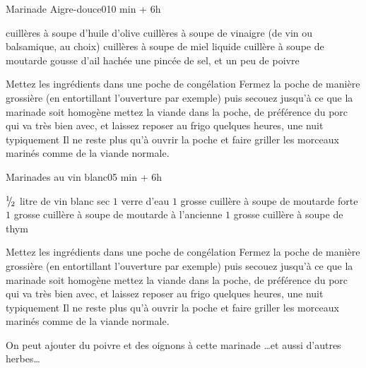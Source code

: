 

\begin{recette}{Marinade Aigre-douce}{0}{10 min + 6h}{}
\begin{ingredients}
 cuillères à soupe d'huile d'olive
 cuillères à soupe de vinaigre (de vin ou balsamique, au choix)
 cuillères à soupe de miel liquide
 cuillère à soupe de moutarde
 gousse d'ail hachée
\ingredient une pincée de sel, et un peu de poivre
\end{ingredients}

\begin{preparation}
\etape Mettez les ingrédients dans une poche de congélation
\etape Fermez la poche de manière grossière (en entortillant l'ouverture par exemple) puis secouez jusqu'à ce que la marinade soit homogène
\etape mettez la viande dans la poche, de préférence du porc qui va très bien avec, et laissez reposer au frigo quelques heures, une nuit typiquement
\etape Il ne reste plus qu'à ouvrir la poche et faire griller les morceaux marinés comme de la viande normale.
\end{preparation}

\end{recette}

\begin{recette}{Marinades au vin blanc}{0}{5 min + 6h}{}
\begin{ingredients}
\ingredient ${{}^{1\!\!}/ _{\!2}}$ litre de vin blanc sec
\ingredient $1$ verre d'eau
\ingredient $1$ grosse cuillère à soupe de moutarde forte
\ingredient $1$ grosse cuillère à soupe de moutarde à l'ancienne
\ingredient $1$ grosse cuillère à soupe de thym
\end{ingredients}

\begin{preparation}
\etape Mettez les ingrédients dans une poche de congélation
\etape Fermez la poche de manière grossière (en entortillant l'ouverture par exemple) puis secouez jusqu'à ce que la marinade soit homogène
\etape mettez la viande dans la poche, de préférence du porc qui va très bien avec, et laissez reposer au frigo quelques heures, une nuit typiquement
\etape Il ne reste plus qu'à ouvrir la poche et faire griller les morceaux marinés comme de la viande normale.
\end{preparation}

\begin{remarque}
On peut ajouter du poivre et des oignons à cette marinade \dots  et aussi d'autres herbes\dots
\end{remarque}
\end{recette}

